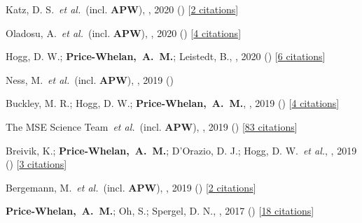 \item[{\color{deemph}\scriptsize9}]Katz, D. S.~\textit{et al.}~(incl. \textbf{APW}), , 2020 () [\href{http://adsabs.harvard.edu/abs/2020arXiv201005102K}{2 citations}]

\item[{\color{deemph}\scriptsize8}]Oladosu, A.~\textit{et al.}~(incl. \textbf{APW}), , 2020 () [\href{http://adsabs.harvard.edu/abs/2020arXiv200704459O}{4 citations}]

\item[{\color{deemph}\scriptsize7}]Hogg, D. W.; \textbf{Price-Whelan,~A.~M.}; Leistedt, B., , 2020 () [\href{http://adsabs.harvard.edu/abs/2020arXiv200514199H}{6 citations}]

\item[{\color{deemph}\scriptsize6}]Ness, M.~\textit{et al.}~(incl. \textbf{APW}), , 2019 ()

\item[{\color{deemph}\scriptsize5}]Buckley, M. R.; Hogg, D. W.; \textbf{Price-Whelan,~A.~M.}, , 2019 () [\href{http://adsabs.harvard.edu/abs/2019arXiv190700987B}{4 citations}]

\item[{\color{deemph}\scriptsize4}]The MSE Science Team~\textit{et al.}~(incl. \textbf{APW}), , 2019 () [\href{http://adsabs.harvard.edu/abs/2019arXiv190404907T}{83 citations}]

\item[{\color{deemph}\scriptsize3}]Breivik, K.; \textbf{Price-Whelan,~A.~M.}; D'Orazio, D. J.; Hogg, D. W.~\textit{et al.}, , 2019 () [\href{http://adsabs.harvard.edu/abs/2019arXiv190305094B}{3 citations}]

\item[{\color{deemph}\scriptsize2}]Bergemann, M.~\textit{et al.}~(incl. \textbf{APW}), , 2019 () [\href{http://adsabs.harvard.edu/abs/2019arXiv190303157B}{2 citations}]

\item[{\color{deemph}\scriptsize1}]\textbf{Price-Whelan,~A.~M.}; Oh, S.; Spergel, D. N., , 2017 () [\href{http://adsabs.harvard.edu/abs/2017arXiv170903532P}{18 citations}]